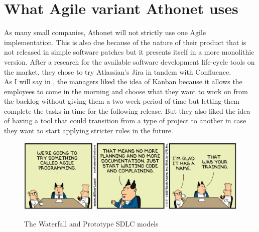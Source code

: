 \section{What Agile variant Athonet uses}
	As many small companies, Athonet will not strictly use one Agile implementation.
	This is also due because of the nature of their product that is not released in simple software patches but it presents itself in a more monolithic version.
	After a research for the available software development life-cycle tools on the market, they chose to try Atlassian's Jira in tandem with Confluence.\\
	As I will say in , the managers liked the idea of Kanban because it allows the employees to come in the morning and choose what they want to work on from the backlog without giving them a two week period of time but letting them complete the tasks in time for the following release.
	But they also liked the idea of having a tool that could transition from a type of project to another in case they want to start applying stricter rules in the future.
	\begin{figure}[H]
		\centering
		\includegraphics[width=\textwidth]{resources/Dilbert_Training_Agile_Programming}\\
		\caption{The Waterfall and Prototype SDLC models}
	\end{figure}

